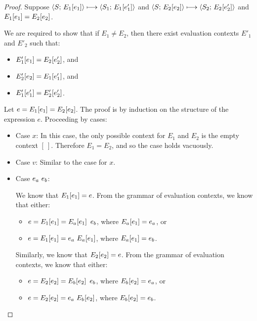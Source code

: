 \begin{proof}
  Suppose $\langle S;\, E_1\hspace{-0.5mm}\left[e_1\right] \rangle \longmapsto \langle S_1;\, E_1\hspace{-0.5mm}\left[e'_1\right] \rangle$ and
  $\langle S;\, E_2\hspace{-0.5mm}\left[e_2\right] \rangle \longmapsto
  \langle S_2;\, E_2\hspace{-0.5mm}\left[e'_2\right] \rangle$ and $E_1\hspace{-0.5mm}\left[e_1\right] =
  E_2\hspace{-0.5mm}\left[e_2\right]$.

  We are required to show that if $E_1 \neq E_2$, then there exist
  evaluation contexts $E'_1$ and $E'_2$ such that:
  \begin{itemize}
  \item $E'_1\hspace{-0.5mm}\left[e_1\right] = E_2\hspace{-0.5mm}\left[e'_2\right]$, and
  \item $E'_2\hspace{-0.5mm}\left[e_2\right] = E_1\hspace{-0.5mm}\left[e'_1\right]$, and
  \item $E'_1\hspace{-0.5mm}\left[e'_1\right] = E'_2\hspace{-0.5mm}\left[e'_2\right]$.
  \end{itemize}

  Let $e = E_1\hspace{-0.5mm}\left[e_1\right] = E_2\hspace{-0.5mm}\left[e_2\right]$.  The proof is
  by induction on the structure of the expression $e$.  Proceeding by
  cases:

  \begin{itemize}

    \item Case $x$: In this case, the only possible context for $E_1$
      and $E_2$ is the empty context $[~]$.  Therefore $E_1 = E_2$,
      and so the case holds vacuously.

    \item Case $v$: Similar to the case for $x$.

    \item Case $e_a~e_b$:

      We know that $E_1\hspace{-0.5mm}\left[e_1\right] = e$.  From the grammar of
      evaluation contexts, we know that either:
      \begin{itemize}
        \item $e = E_1\hspace{-0.5mm}\left[e_1\right] = E_a\hspace{-0.5mm}\left[e_1\right]~e_b$, where $E_a\hspace{-0.5mm}\left[e_1\right] = e_a$, or
        \item $e = E_1\hspace{-0.5mm}\left[e_1\right] = e_a~E_a\hspace{-0.5mm}\left[e_1\right]$, where $E_a\hspace{-0.5mm}\left[e_1\right] = e_b$.
      \end{itemize}

      Similarly, we know that $E_2\hspace{-0.5mm}\left[e_2\right] = e$.  From the grammar of
      evaluation contexts, we know that either:
      \begin{itemize}
        \item $e = E_2\hspace{-0.5mm}\left[e_2\right] = E_b\hspace{-0.5mm}\left[e_2\right]~e_b$, where $E_b\hspace{-0.5mm}\left[e_2\right] = e_a$, or
        \item $e = E_2\hspace{-0.5mm}\left[e_2\right] = e_a~E_b\hspace{-0.5mm}\left[e_2\right]$, where $E_b\hspace{-0.5mm}\left[e_2\right] = e_b$.
      \end{itemize}


\end{itemize}
\end{proof}
